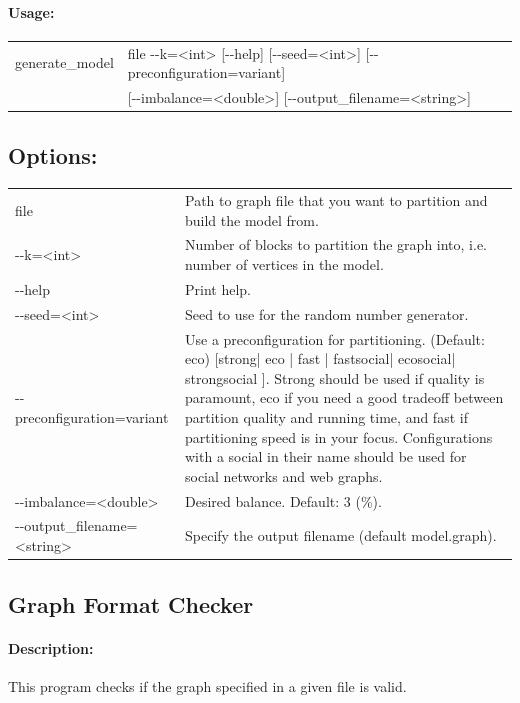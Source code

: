 \documentclass[11pt]{article}
\begin{document}
\paragraph*{Usage:\\} 

\begin{tabular}{ll}
generate\_model &   file -{}-k=<int> [-{}-help] [-{}-seed=<int>]  [-{}-preconfiguration=variant] \\
       &  [-{}-imbalance=<double>] [-{}-output\_filename=<string>] 
\end{tabular}
\subsection*{Options:\\}

\begin{tabularx}{\textwidth}{lX}
  file                        & Path to graph file that you want to partition and build the model from. \\
  -{}-k=<int>                   & Number of blocks to partition the graph into, i.e. number of vertices in the model. \\
  -{}-help                      & Print help. \\
  -{}-seed=<int>                & Seed to use for the random number generator. \\
  -{}-preconfiguration=variant & Use a preconfiguration for partitioning. (Default: eco) [strong| eco | fast | fastsocial| ecosocial| strongsocial ]. Strong should be used if quality is paramount, eco if you need a good tradeoff between partition quality and running time, and fast if partitioning speed is in your focus. Configurations with a social in their name should be used for social networks and web graphs. \\
  -{}-imbalance=<double>        & Desired balance. Default: 3 (\%). \\
  -{}-output\_filename=<string> & Specify the output filename (default model.graph). \\
\end{tabularx}
\vfill
\pagebreak

\subsection{Graph Format Checker}
\paragraph*{Description:} This program checks if the graph specified in a given file is valid. 
\end{document}
